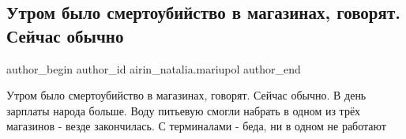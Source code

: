  
 
 
 
 

\subsection{Утром было смертоубийство в магазинах, говорят. Сейчас обычно}
\label{sec:24_02_2022.fb.airin_natalia.mariupol.1.utrom_bilo_smertoubi}

\ifcmt
 author_begin
   author_id airin_natalia.mariupol
 author_end
\fi

Утром было смертоубийство в магазинах, говорят. Сейчас обычно. В день зарплаты
народа больше. Воду питьевую смогли набрать в одном из трёх магазинов - везде
закончилась.  С терминалами - беда, ни в одном не работают

